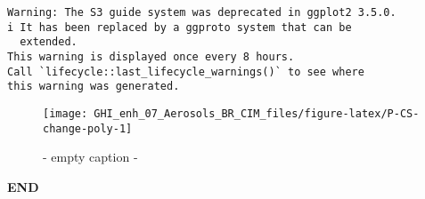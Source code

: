 \documentclass[
  10pt,
  a4paper,oneside]{article}
\begin{document}
\begin{verbatim}
Warning: The S3 guide system was deprecated in ggplot2 3.5.0.
i It has been replaced by a ggproto system that can be
  extended.
This warning is displayed once every 8 hours.
Call `lifecycle::last_lifecycle_warnings()` to see where
this warning was generated.
\end{verbatim}

\begin{figure}[H]

{\centering \texttt{[image: GHI\_enh\_07\_Aerosols\_BR\_CIM\_files/figure-latex/P-CS-change-poly-1]} 

}

\caption{ - empty caption - }\label{fig:P-CS-change-poly}
\end{figure}

\textbf{END}
\end{document}
